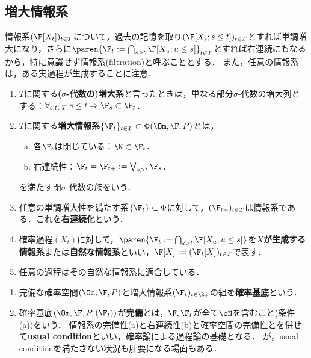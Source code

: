 \documentclass[uplatex,dvipdfmx]{jsreport}
\begin{document}
\subsection{増大情報系}

\begin{tcolorbox}[colframe=ForestGreen, colback=ForestGreen!10!white,breakable,colbacktitle=ForestGreen!40!white,coltitle=black,fonttitle=\bfseries\sffamily,
title=]
    情報系$(\F[X_t])_{t\in T}$について，過去の記憶を取り$(\F[X_s;s\le t])_{t\in T}$とすれば単調増大になり，さらに$\paren{\F_t:=\bigcap_{s>t}\F[X_u;u\le s]}_{t\in T}$とすれば右連続にもなるから，特に意識せず情報系(filtration)と呼ぶこととする．
    また，任意の情報系は，ある実過程が生成することに注意．
\end{tcolorbox}

\begin{definition}[filtration]\mbox{}
    \begin{enumerate}
        \item $T$に関する\textbf{($\sigma$-代数の)増大系}と言ったときは，単なる部分$\sigma$-代数の増大列とする：$\forall_{s,t\in T}\;s\le t\Rightarrow\F_s\subset\F_t$．
        \item $T$に関する\textbf{増大情報系}$\{\F_t\}_{t\in T}\subset\Phi(\Om,\F,P)$とは，
        \begin{enumerate}[(a)]
            \item 各$\F_t$は閉じている：$\N\subset\F_t$．
            \item 右連続性：$\F_t=\F_{t+}:=\bigvee_{s>t}\F_s$．
        \end{enumerate}
        を満たす閉$\sigma$-代数の族をいう．
        \item 任意の単調増大性を満たす系$\{\F_t\}\subset\Phi$に対して，$(\F_{t+})_{t\in T}$は情報系である．これを\textbf{右連続化}という．
        \item 確率過程$(X_t)$に対して，$\paren{\F_t:=\bigcap_{s>t}\F[X_u;u\le s]}$を\textbf{$X$が生成する情報系}または\textbf{自然な情報系}といい，$\F[X]:=(\F_t[X])_{t\in T}$で表す．
        \item 任意の過程はその自然な情報系に適合している．
    \end{enumerate}
\end{definition}

\begin{definition}\mbox{}
    \begin{enumerate}
        \item 完備な確率空間$(\Om,\F,P)$と増大情報系$(\F_t)_{t\in\R_+}$の組を\textbf{確率基底}という\cite{Liptser-Shiryaev-Statistics}．
        \item 確率基底$(\Om,\F,P,(\F_t))$が\textbf{完備}とは，$\F,\F_t$が全て$\cN$を含むこと(条件(a))をいう．
        情報系の完備性(a)と右連続性(b)と確率空間の完備性とを併せて\textbf{usual condition}といい，確率論による過程論の基礎となる．
        が，usual conditionを満たさない状況も肝要になる場面もある．
    \end{enumerate}
\end{definition}
\end{document}
